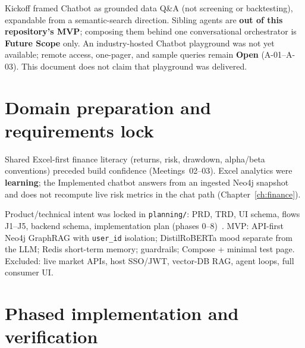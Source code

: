 \noindent
Kickoff framed Chatbot as grounded data Q\&A (not screening or backtesting), expandable from a semantic-search direction. Sibling agents are \textbf{out of this repository's MVP}; composing them behind one conversational orchestrator is \textbf{Future Scope} only. An industry-hosted Chatbot playground was not yet available; remote access, one-pager, and sample queries remain \textbf{Open} (A-01--A-03). This document does not claim that playground was delivered.

\section{Domain preparation and requirements lock}

Shared Excel-first finance literacy (returns, risk, drawdown, alpha/beta conventions) preceded build confidence (Meetings~02--03). Excel analytics were \textbf{learning}; the Implemented chatbot answers from an ingested Neo4j snapshot and does not recompute live risk metrics in the chat path (Chapter~\ref{ch:finance}).

Product/technical intent was locked in \texttt{planning/}: PRD, TRD, UI schema, flows J1--J5, backend schema, implementation plan (phases 0--8)~\cite{prd,trd}. MVP: API-first Neo4j GraphRAG with \texttt{user\_id} isolation; DistilRoBERTa mood separate from the LLM; Redis short-term memory; guardrails; Compose + minimal test page. Excluded: live market APIs, host SSO/JWT, vector-DB RAG, agent loops, full consumer UI.

\section{Phased implementation and verification}

